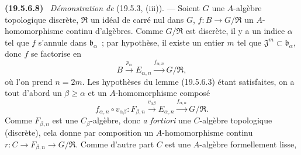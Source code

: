 \documentclass[10pt,oneside]{book}
\makeatletter
\newcommand{\setmanualcurrentlabel}[1]{\def\@currentlabel{#1}}
\newcommand{\oldpage}[2][]{%
  \setcounter{footnote}{0}%
  \marginpar{\scriptsize\textbf{#1}~|~#2}\ignorespaces}
\newenvironment{env}[1][]{\setmanualcurrentlabel{#1}\par\medskip\noindent\textbf{(#1)}\ }{\par}
\makeatother
\begin{document}
\begin{env}[19.5.6.8]
\label{0.19.5.6.8-fr}
\emph{Démonstration de} (19.5.3, (iii)). --- Soient $G$ une $A$-algèbre
topologique discrète, $\mathfrak R$ un idéal de carré nul dans $G$,
$f:B\to G/\mathfrak R$ un $A$-homomorphisme continu d'algèbres. Comme
$G/\mathfrak R$ est discrète, il y a un indice $\alpha$ tel que $f$ s'annule
dans $\mathfrak b_\alpha$~; par hypothèse, il existe un entier $m$ tel que
$\mathfrak J^m\subset\mathfrak b_\alpha$, donc $f$ se factorise en
\[
  B\xrightarrow{p_\alpha}E_{\alpha,n}
  \xrightarrow{f_{\alpha,n}}G/\mathfrak R,
\]
où l'on prend $n=2m$. Les hypothèses du lemme (19.5.6.3) étant satisfaites, on
a tout d'abord un $\beta\geq\alpha$ et un $A$-homomorphisme composé
\begin{equation}
\label{0.19.5.6.9-fr}
  f_{\alpha,n}\circ v_{\alpha\beta}:F_{\beta,n}
  \xrightarrow{v_{\alpha\beta}}E_{\alpha,n}
  \xrightarrow{f_{\alpha,n}}G/\mathfrak R.
  \tag{19.5.6.9}
\end{equation}
Comme $F_{\beta,n}$ est une $C_\beta$-algèbre, donc \emph{a fortiori} une
$C$-algèbre topologique (discrète), cela donne par composition un
$A$-homomorphisme continu
$r:C\to F_{\beta,n}\to G/\mathfrak R$. Comme d'autre part $C$ est une
$A$-algèbre formellement lisse,

\oldpage[0\textsubscript{IV-1}]{99}


\end{env}
\end{document}
